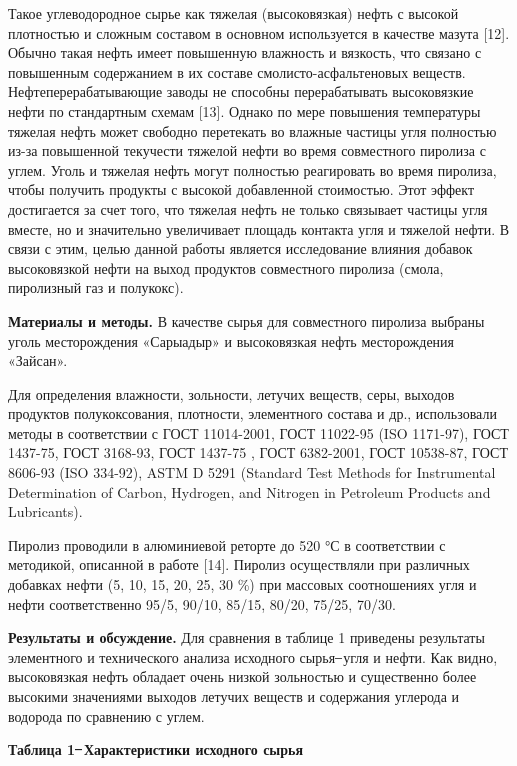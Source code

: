 \begin{multicols}{2}
Такое углеводородное сырье как тяжелая (высоковязкая) нефть с высокой
плотностью и сложным составом в основном используется в качестве мазута
{[}12{]}. Обычно такая нефть имеет повышенную влажность и вязкость, что
связано с повышенным содержанием в их составе смоли­сто-асфальтеновых
веществ. Нефтеперерабатывающие заводы не способны перерабатывать
высоковязкие нефти по стандартным схемам {[}13{]}. Однако по мере
повышения температуры тяжелая нефть может свободно перетекать во влажные
частицы угля полностью из-за повышенной текучести тяжелой нефти во время
совместного пиролиза с углем. Уголь и тяжелая нефть могут полностью
реагировать во время пиролиза, чтобы получить продукты с высокой
добавленной стоимостью. Этот эффект достигается за счет того, что
тяжелая нефть не только связывает частицы угля вместе, но и значительно
увеличивает площадь контакта угля и тяжелой нефти. В связи с этим, целью
данной работы является исследование влияния добавок высоковязкой нефти
на выход продуктов совместного пиролиза (смола, пиролизный газ и
полукокс).

{\bfseries Материалы и методы.} В качестве сырья для совместного пиролиза
выбраны уголь месторождения «Сарыадыр» и высоковязкая нефть
месторождения «Зайсан».

Для определения влажности, зольности, летучих веществ, серы, выходов
продуктов полукоксования, плотности, элементного состава и др.,
использовали методы в соответствии с ГОСТ 11014-2001, ГОСТ 11022-95 (ISO
1171-97), ГОСТ 1437-75, ГОСТ 3168-93, ГОСТ 1437-75 , ГОСТ 6382-2001,
ГОСТ 10538-87, ГОСТ 8606-93 (ISO 334-92), ASTM D 5291 (Standard Test
Methods for Instrumental Determination of Carbon, Hydrogen, and Nitrogen
in Petroleum Products and Lubricants).

Пиролиз проводили в алюминиевой реторте до 520 °С в соответствии с
методикой, описанной в работе {[}14{]}. Пиролиз осуществляли при
различных добавках нефти (5, 10, 15, 20, 25, 30 \%) при массовых
соотношениях угля и нефти соответственно 95/5, 90/10, 85/15, 80/20,
75/25, 70/30.

{\bfseries Результаты и обсуждение.} Для сравнения в таблице 1 приведены
результаты элементного и технического анализа исходного сырья ̶ угля и
нефти. Как видно, высоковязкая нефть обладает очень низкой зольностью и
существенно более высокими значениями выходов летучих веществ и
содержания углерода и водорода по сравнению с углем.
\end{multicols}

{\bfseries Таблица 1 ̶ Характеристики исходного сырья}

